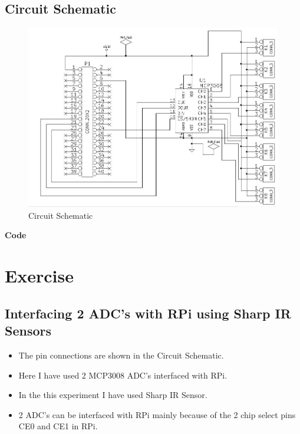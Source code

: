 \documentclass[11pt,a4paper]{article}
\begin{document}
\subsection{Circuit Schematic}
        \vspace{3cm}
        \begin{figure}[h!]
		\includegraphics[scale=0.6]{ckt_schematic.jpg}
		\centering
        \caption{Circuit Schematic}
        \end{figure}

	\newpage 
	\textbf{Code}
	\vspace{0.3cm}
	
	
	
\newpage	
\section{Exercise}
\subsection{Interfacing 2 ADC's with RPi using Sharp IR Sensors}
\begin{itemize}
  \item The pin connections are shown in the Circuit Schematic.
  \item Here I have used 2 MCP3008 ADC's interfaced with RPi.
  \item In the this experiment I have used Sharp IR Sensor.
  \item 2 ADC's can be interfaced with RPi mainly because of the 2 chip select pins CE0 and CE1 in RPi.
  \end{itemize}
\end{document}
